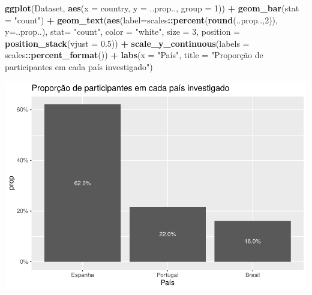 \documentclass[
]{book}
\newenvironment{Shaded}{\begin{snugshade}}{\end{snugshade}}
\newcommand{\DataTypeTok}[1]{\textcolor[rgb]{0.13,0.29,0.53}{#1}}
\newcommand{\DecValTok}[1]{\textcolor[rgb]{0.00,0.00,0.81}{#1}}
\newcommand{\FloatTok}[1]{\textcolor[rgb]{0.00,0.00,0.81}{#1}}
\newcommand{\KeywordTok}[1]{\textcolor[rgb]{0.13,0.29,0.53}{\textbf{#1}}}
\newcommand{\NormalTok}[1]{#1}
\newcommand{\OperatorTok}[1]{\textcolor[rgb]{0.81,0.36,0.00}{\textbf{#1}}}
\newcommand{\StringTok}[1]{\textcolor[rgb]{0.31,0.60,0.02}{#1}}
\begin{document}
\begin{Shaded}
\begin{Highlighting}[]
\KeywordTok{ggplot}\NormalTok{(Dataset, }\KeywordTok{aes}\NormalTok{(}\DataTypeTok{x =}\NormalTok{ country, }\DataTypeTok{y =}\NormalTok{ ..prop.., }\DataTypeTok{group =} \DecValTok{1}\NormalTok{)) }\OperatorTok{+}\StringTok{ }
\StringTok{  }\KeywordTok{geom_bar}\NormalTok{(}\DataTypeTok{stat =} \StringTok{"count"}\NormalTok{) }\OperatorTok{+}
\StringTok{  }\KeywordTok{geom_text}\NormalTok{(}\KeywordTok{aes}\NormalTok{(}\DataTypeTok{label=}\NormalTok{scales}\OperatorTok{::}\KeywordTok{percent}\NormalTok{(}\KeywordTok{round}\NormalTok{(..prop..,}\DecValTok{2}\NormalTok{)), }
                \DataTypeTok{y=}\NormalTok{..prop..), }\DataTypeTok{stat=} \StringTok{"count"}\NormalTok{, }\DataTypeTok{color =} \StringTok{"white"}\NormalTok{, }\DataTypeTok{size =} \DecValTok{3}\NormalTok{, }\DataTypeTok{position =} \KeywordTok{position_stack}\NormalTok{(}\DataTypeTok{vjust =} \FloatTok{0.5}\NormalTok{)) }\OperatorTok{+}
\StringTok{  }\KeywordTok{scale_y_continuous}\NormalTok{(}\DataTypeTok{labels =}\NormalTok{ scales}\OperatorTok{::}\KeywordTok{percent_format}\NormalTok{()) }\OperatorTok{+}
\StringTok{  }\KeywordTok{labs}\NormalTok{(}\DataTypeTok{x =} \StringTok{"País"}\NormalTok{, }\DataTypeTok{title =} \StringTok{"Proporção de participantes em cada país investigado"}\NormalTok{)}
\end{Highlighting}
\end{Shaded}

\begin{center}\includegraphics{gitbook-demo_files/figure-latex/unnamed-chunk-14-1} \end{center}
\end{document}
